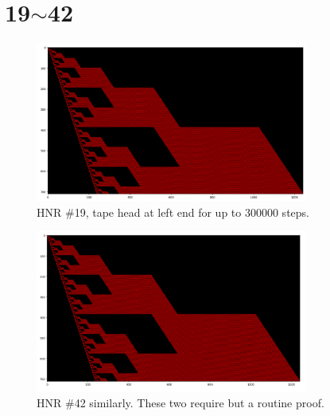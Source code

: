 \documentclass[12pt]{article}
\begin{document}
\clearpage
{}
{}
\section*{19$\sim$42}

\begin{figure}[H]
\centering
\includegraphics[width=0.8\textwidth]{19.png}
\caption{HNR \#19, tape head at left end for up to 300000 steps.}
\end{figure}

\begin{figure}[H]
\centering
\includegraphics[width=0.8\textwidth]{42.png}
\caption{HNR \#42 similarly. These two require but a routine proof.}
\end{figure}

\clearpage
{}
{}
\end{document}
